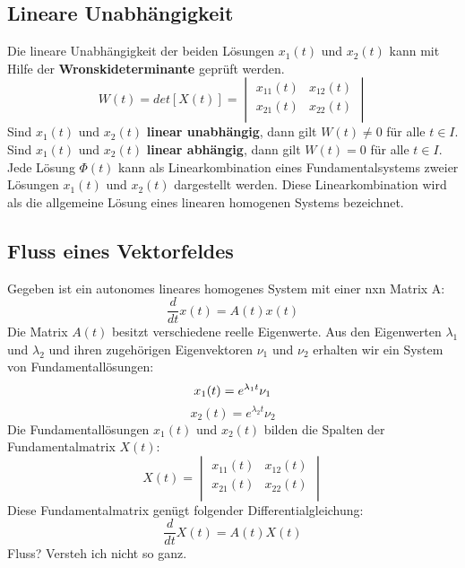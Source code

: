 \subsection{Lineare Unabhängigkeit}
Die lineare Unabhängigkeit der beiden Lösungen $x_1(t)$ und $x_2(t)$ kann mit Hilfe der \textbf{Wronskideterminante} geprüft werden. 
\begin{equation*}
	W(t) = det[X(t)] =    
	\begin{vmatrix} 
	        x_{11}(t) & x_{12}(t)\\ 
	        x_{21}(t) & x_{22}(t)\\   
	\end{vmatrix}
\end{equation*}
Sind $x_1(t)$ und $x_2(t)$ \textbf{linear unabhängig}, dann gilt $W(t) \neq 0$ für alle $t \in I$. \\
Sind $x_1(t)$ und $x_2(t)$ \textbf{linear abhängig}, dann gilt $W(t) = 0$ für alle $t \in I$. \\
Jede Lösung $\Phi(t)$ kann als Linearkombination eines Fundamentalsystems zweier Lösungen $x_1(t)$ und $x_2(t)$ dargestellt werden. Diese Linearkombination wird als die allgemeine Lösung eines linearen homogenen Systems bezeichnet. 
\subsection{Fluss eines Vektorfeldes}
Gegeben ist ein autonomes lineares homogenes System mit einer nxn Matrix A:
\begin{equation*}
\frac{d}{dt}x(t) = A(t)x(t)
\end{equation*}
Die Matrix $A(t)$ besitzt verschiedene reelle Eigenwerte. Aus den Eigenwerten $\lambda_1$ und $\lambda_2$ und ihren zugehörigen Eigenvektoren $\nu_1$ und $\nu_2$ erhalten wir ein System von Fundamentallösungen: 
\begin{equation*}
x_1(t) = e^{\lambda_1t}\nu_1\\
\end{equation*}
\begin{equation*}
x_2(t) = e^{\lambda_2t}\nu_2
\end{equation*}
Die Fundamentallösungen $x_1(t)$ und $x_2(t)$ bilden die Spalten der Fundamentalmatrix $X(t)$:
\begin{equation*}
	X(t) =     
	\begin{vmatrix} 
	        x_{11}(t) & x_{12}(t)\\ 
	        x_{21}(t) & x_{22}(t)\\   
	\end{vmatrix}
\end{equation*}
Diese Fundamentalmatrix genügt folgender Differentialgleichung: 
\begin{equation*}
\frac{d}{dt}X(t) = A(t)X(t)
\end{equation*}
Fluss? Versteh ich nicht so ganz. 

